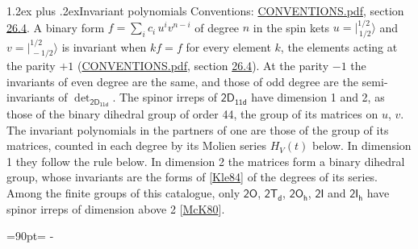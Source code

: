 \documentclass[10pt,a4paper]{article}
\makeatletter
\renewcommand\section{\@startsection{section}{1}{\z@}{-3ex plus -1ex minus -.2ex}%
  {1.2ex plus .2ex}{\normalfont\large\sffamily\bfseries\color{parttitle}}}
\newcommand{\needspace}[1]{\par\penalty-100\begingroup\dimen0=#1\relax\dimen2=\pagegoal
  \advance\dimen2-\pagetotal\ifdim\dimen0>\dimen2\relax\ifdim\dimen2>0pt\vfil\break\fi\fi
  \endgroup}
\numberwithin{equation}{section}
\newcommand{\grp}[1]{\mathsf{#1}}
\newcommand{\jm}[2]{\bigl\lvert{}^{#1}_{\,#2}\bigr\rangle}
\makeatother
\begin{document}
\section{Invariant polynomials}\label{s:invariants}
Conventions: \href{../../CONVENTIONS.pdf}{CONVENTIONS.pdf}, section \href{../../CONVENTIONS.pdf\#conv.26.4}{26.4}.
\leavevmode\label{n:local.binary.form}A binary form $f = \sum_i c_i\, u^i v^{n-i}$ of degree $n$ in the spin kets $u = \jm{1/2}{1/2}$ and $v = \jm{1/2}{-1/2}$ is invariant when $k f = f$ for every element $k$, the elements acting at the parity $+1$ (\href{../../CONVENTIONS.pdf}{CONVENTIONS.pdf}, section \href{../../CONVENTIONS.pdf\#conv.26.4}{26.4}). At the parity $-1$ the invariants of even degree are the same, and those of odd degree are the semi-invariants of $\det_{\grp{2D_{11d}}}$.
The spinor irreps of $\grp{2D_{11d}}$ have dimension 1 and 2, as those of the binary dihedral group of order 44, the group of its matrices on $u$, $v$. \label{n:function.hilbert}The invariant polynomials in the partners of one are those of the group of its matrices, counted in each degree by its Molien series $H_V(t)$ below. In dimension 1 they follow the rule below. In dimension 2 the matrices form a binary dihedral group, whose invariants are the forms of [\href{../../../REFERENCES.pdf\#ref.Kle84}{Kle84}] of the degrees of its series. Among the finite groups of this catalogue, only $\grp{2O}$, $\grp{2T_{d}}$, $\grp{2O_{h}}$, $\grp{2I}$ and $\grp{2I_{h}}$ have spinor irreps of dimension above 2 [\href{../../../REFERENCES.pdf\#ref.McK80}{McK80}].
\needspace{90pt}
\end{document}

